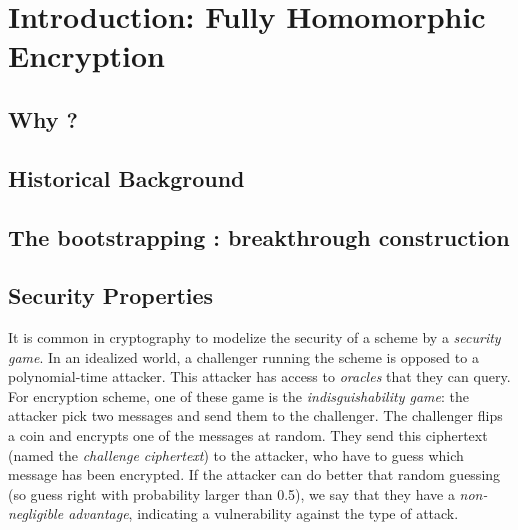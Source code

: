 
\chapter{Introduction: Fully Homomorphic Encryption}



\section{Why ?}





\section{Historical Background}





\section{The bootstrapping : breakthrough construction}
\label{sec:gentry_bootstrapping}




\section{Security Properties}



It is common in cryptography to modelize the security of a scheme by a \textit{security game}. In an idealized world, a challenger running the scheme is opposed to a polynomial-time attacker. This attacker has access to \textit{oracles} that they can query. For encryption scheme, one of these game is the \textit{indisguishability game}: the attacker pick two messages and send them to the challenger. The challenger flips a coin and encrypts one of the messages at random. They send this ciphertext (named the \textit{challenge ciphertext}) to the attacker, who have to guess which message has been encrypted. If the attacker can do better that random guessing (so guess right with probability larger than 0.5), we say that they have a \textit{non-negligible advantage}, indicating a vulnerability against the type of attack.

